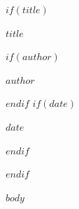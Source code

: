 \documentclass[11pt,a4paper]{article}
\begin{document}
$if(title)$
\begin{center}
{\LARGE\bfseries $title$\par}
\vspace{4mm}
$if(author)${\large $author$\par}$endif$
$if(date)${\small $date$\par}$endif$
\end{center}
\vspace{8mm}
$endif$

$body$
\end{document}
